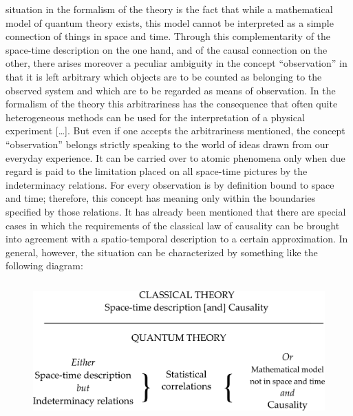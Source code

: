 situation in the formalism of the theory is the fact that while a
mathematical model of quantum theory exists, this model cannot be
interpreted as a simple connection of things in space and time. Through
this complementarity of the space-time description on the one hand, and
of the causal connection on the other, there arises moreover a peculiar
ambiguity in the concept ``observation'' in that it is left arbitrary
which objects are to be counted as belonging to the observed system and
which are to be regarded as means of observation. In the formalism of
the theory this arbitrariness has the consequence that often quite
heterogeneous methods can be used for the interpretation of a physical
experiment [\ldots]. But even if one accepts the arbitrariness mentioned,
the concept ``observation'' belongs strictly speaking to the world of
ideas drawn from our everyday experience. It can be carried over to
atomic phenomena only when due regard is paid to the limitation placed
on all space-time pictures by the indeterminacy relations. For every
observation is by definition bound to space and time; therefore, this
concept has meaning only within the boundaries specified by those
relations. It has already been mentioned that there are special cases in
which the requirements of the classical law of causality can be brought
into agreement with a spatio-temporal description to a certain
approximation. In general, however, the situation can be characterized
by something like the following diagram:

\begin{figure}[h] %
  \begin{center}
    \includegraphics[width=5.1in,height=2.08in]{images/10_heisenberg/heisenberg-table.png}
  \end{center}
\end{figure}

